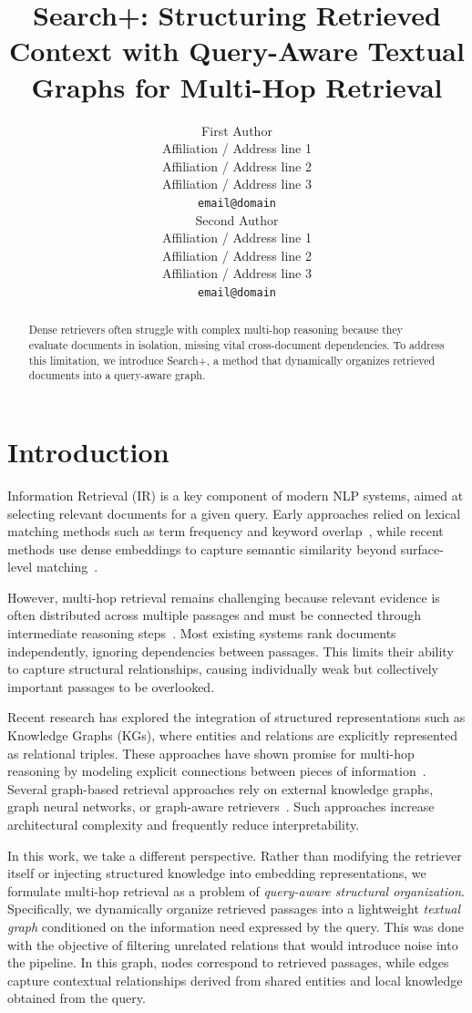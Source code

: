\documentclass[11pt]{article}
\title{Search+: Structuring Retrieved Context with Query-Aware Textual Graphs for Multi-Hop Retrieval}
\author{First Author \\
  Affiliation / Address line 1 \\
  Affiliation / Address line 2 \\
  Affiliation / Address line 3 \\
  \texttt{email@domain} \\\And
  Second Author \\
  Affiliation / Address line 1 \\
  Affiliation / Address line 2 \\
  Affiliation / Address line 3 \\
  \texttt{email@domain} \\}
\begin{document}
\maketitle

\begin{abstract}
Dense retrievers often struggle with complex multi-hop reasoning because they evaluate documents in isolation, missing vital cross-document dependencies. To address this limitation, we introduce Search+, a method that dynamically organizes retrieved documents into a query-aware graph.
\end{abstract}



\section{Introduction}

Information Retrieval (IR) is a key component of modern NLP systems, aimed at selecting relevant documents for a given query. Early approaches relied on lexical matching methods such as term frequency and keyword overlap~\cite{DBLP:journals/ftir/RobertsonZ09}, while recent methods use dense embeddings to capture semantic similarity beyond surface-level matching~\cite{DBLP:journals/tois/ZhaoLRW24}.

However, multi-hop retrieval remains challenging because relevant evidence is often distributed across multiple passages and must be connected through intermediate reasoning steps~\cite{DBLP:conf/iclr/XiongLIDLWMY0KO21}. Most existing systems rank documents independently, ignoring dependencies between passages. This limits their ability to capture structural relationships, causing individually weak but collectively important passages to be overlooked.


Recent research has explored the integration of structured representations such as Knowledge Graphs (KGs), where entities and relations are explicitly represented as relational triples. These approaches have shown promise for multi-hop reasoning by modeling explicit connections between pieces of information~\cite{DBLP:journals/apin/LindersT25, DBLP:journals/computers/OsipjanKKGG25}. Several graph-based retrieval approaches rely on external knowledge graphs, graph neural networks, or graph-aware retrievers~\cite{DBLP:conf/acl/MavromatisK25, DBLP:conf/aaai/0160LRSZD24}. Such approaches increase architectural complexity and frequently reduce interpretability.

In this work, we take a different perspective. Rather than modifying the retriever itself or injecting structured knowledge into embedding representations, we formulate multi-hop retrieval as a problem of \emph{query-aware structural organization}. Specifically, we dynamically organize retrieved passages into a lightweight \emph{textual graph} conditioned on the information need expressed by the query. This was done with the objective of filtering unrelated relations that would introduce noise into the pipeline. In this graph, nodes correspond to retrieved passages, while edges capture contextual relationships derived from shared entities and local knowledge obtained from the query.
\end{document}
